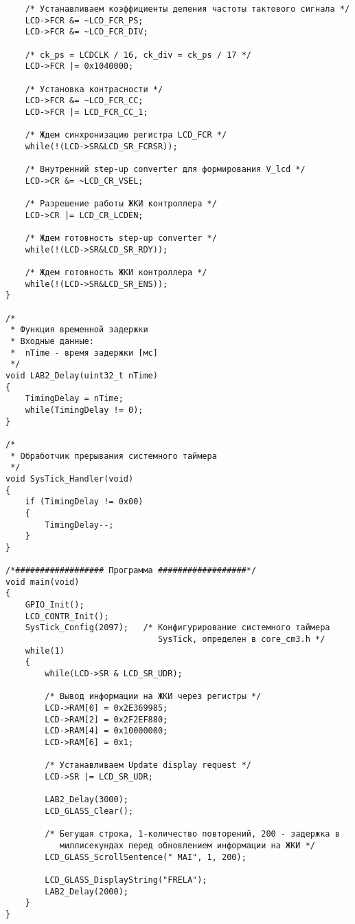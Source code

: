 \begin{verbatim}
    /* Устанавливаем коэффициенты деления частоты тактового сигнала */
    LCD->FCR &= ~LCD_FCR_PS;
    LCD->FCR &= ~LCD_FCR_DIV;

    /* ck_ps = LCDCLK / 16, ck_div = ck_ps / 17 */
    LCD->FCR |= 0x1040000;

    /* Установка контрасности */
    LCD->FCR &= ~LCD_FCR_CC;
    LCD->FCR |= LCD_FCR_CC_1;

    /* Ждем синхронизацию регистра LCD_FCR */
    while(!(LCD->SR&LCD_SR_FCRSR));

    /* Внутренний step-up converter для формирования V_lcd */
    LCD->CR &= ~LCD_CR_VSEL;

    /* Разрешение работы ЖКИ контроллера */
    LCD->CR |= LCD_CR_LCDEN;

    /* Ждем готовность step-up converter */
    while(!(LCD->SR&LCD_SR_RDY));

    /* Ждем готовность ЖКИ контроллера */
    while(!(LCD->SR&LCD_SR_ENS));
}

/*
 * Функция временной задержки
 * Входные данные:
 *  nTime - время задержки [мс]
 */
void LAB2_Delay(uint32_t nTime)
{
    TimingDelay = nTime;
    while(TimingDelay != 0);
}

/*
 * Обработчик прерывания системного таймера
 */
void SysTick_Handler(void)
{
    if (TimingDelay != 0x00)
    {
        TimingDelay--;
    }
}

/*################## Программа ##################*/
void main(void)
{
    GPIO_Init();
    LCD_CONTR_Init();
    SysTick_Config(2097);   /* Конфигурирование системного таймера 
                               SysTick, определен в core_cm3.h */
    while(1)
    {
        while(LCD->SR & LCD_SR_UDR);
        
        /* Вывод информации на ЖКИ через регистры */
        LCD->RAM[0] = 0x2E369985;
        LCD->RAM[2] = 0x2F2EF880;
        LCD->RAM[4] = 0x10000000;
        LCD->RAM[6] = 0x1;

        /* Устанавливаем Update display request */
        LCD->SR |= LCD_SR_UDR;
        
        LAB2_Delay(3000);
        LCD_GLASS_Clear();

        /* Бегущая строка, 1-количество повторений, 200 - задержка в
           миллисекундах перед обновлением информации на ЖКИ */
        LCD_GLASS_ScrollSentence(" MAI", 1, 200);

        LCD_GLASS_DisplayString("FRELA");
        LAB2_Delay(2000);
    }
}
\end{verbatim}